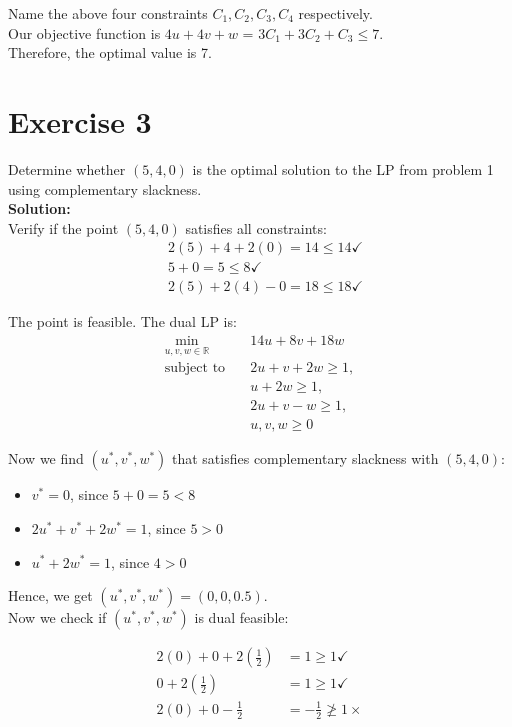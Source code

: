 \documentclass{article}
\begin{document}
Name the above four constraints $C_1, C_2, C_3, C_4$ respectively. \\

Our objective function is $4u + 4v + w$ = $3C_1 + 3C_2 + C_3 \leq 7$. \\

Therefore, the optimal value is 7.

\newpage

\section*{Exercise 3}
Determine whether $(5, 4, 0)$ is the optimal solution to the LP from problem 1 using complementary slackness. \\

\textbf{Solution:} \\

Verify if the point $(5,4,0)$ satisfies all constraints:
\begin{align*}
&2(5) + 4 + 2(0) = 14 \leq 14 \checkmark\\
&5 + 0 = 5 \leq 8 \checkmark\\
&2(5) + 2(4) - 0 = 18 \leq 18 \checkmark
\end{align*}

The point is feasible. The dual LP is:
\begin{align*}
\min_{u, v, w \in \mathbb{R}} \quad & 14u + 8v + 18w \\
\text{subject to} \quad & 2u + v + 2w \geq 1, \\
& u + 2w \geq 1, \\
& 2u + v - w \geq 1, \\
& u, v, w \geq 0
\end{align*}

Now we find $(u^*, v^*, w^*)$ that satisfies complementary slackness with $(5,4,0)$:
\begin{itemize}
    \item $v^* = 0$, since $5 + 0 = 5 < 8$
    \item $2u^* + v^* + 2w^* = 1$, since $5 > 0$
    \item $u^* + 2w^* = 1$, since $4 > 0$
\end{itemize}

Hence, we get $(u^*, v^*, w^*) = (0, 0, 0.5)$. \\

Now we check if $(u^*, v^*, w^*)$ is dual feasible:

\begin{align*}
2(0) + 0 + 2(\frac{1}{2}) &= 1 \geq 1 \checkmark\\
0 + 2(\frac{1}{2}) &= 1 \geq 1 \checkmark\\
2(0) + 0 - \frac{1}{2} &= -\frac{1}{2} \not\geq 1 \times
\end{align*}
\end{document}
